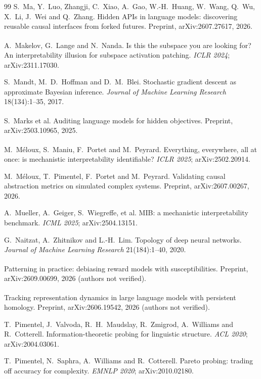 \documentclass[11pt,a4paper]{article}
\newcommand{\unv}{\textsuperscript{\dag}}
\begin{document}
\begin{thebibliography}{99}
 S.~Ma, Y.~Luo, Zhangji, C.~Xiao, A.~Gao, W.-H.~Huang, W.~Wang,
Q.~Wu, X.~Li, J.~Wei and Q.~Zhang. Hidden APIs in language models:
discovering reusable causal interfaces from forked futures. Preprint,
arXiv:2607.27617, 2026.

\unv{} A.~Makelov, G.~Lange and N.~Nanda. Is this the
subspace you are looking for? An interpretability illusion for subspace
activation patching. \emph{ICLR 2024}; arXiv:2311.17030.

 S.~Mandt, M.~D.~Hoffman and D.~M.~Blei. Stochastic
gradient descent as approximate Bayesian inference. \emph{Journal of
Machine Learning Research} 18(134):1--35, 2017.

\unv{} S.~Marks et al. Auditing language models for
hidden objectives. Preprint, arXiv:2503.10965, 2025.

\unv{} M.~M\'eloux, S.~Maniu, F.~Portet and
M.~Peyrard. Everything, everywhere, all at once: is mechanistic
interpretability identifiable? \emph{ICLR 2025}; arXiv:2502.20914.

 M.~M\'eloux, T.~Pimentel, F.~Portet and M.~Peyrard.
Validating causal abstraction metrics on simulated complex systems.
Preprint, arXiv:2607.00267, 2026.

 A.~Mueller, A.~Geiger, S.~Wiegreffe, et al. MIB: a
mechanistic interpretability benchmark. \emph{ICML 2025};
arXiv:2504.13151.

 G.~Naitzat, A.~Zhitnikov and L.-H.~Lim. Topology of
deep neural networks. \emph{Journal of Machine Learning Research}
21(184):1--40, 2020.

\unv{} Patterning in practice: debiasing
reward models with susceptibilities. Preprint, arXiv:2609.00699, 2026
(authors not verified).

\unv{} Tracking representation dynamics in large
language models with persistent homology. Preprint, arXiv:2606.19542, 2026
(authors not verified).

 T.~Pimentel, J.~Valvoda, R.~H.~Maudslay,
R.~Zmigrod, A.~Williams and R.~Cotterell. Information-theoretic probing
for linguistic structure. \emph{ACL 2020}; arXiv:2004.03061.

 T.~Pimentel, N.~Saphra, A.~Williams and
R.~Cotterell. Pareto probing: trading off accuracy for complexity.
\emph{EMNLP 2020}; arXiv:2010.02180.


\end{thebibliography}
\end{document}
